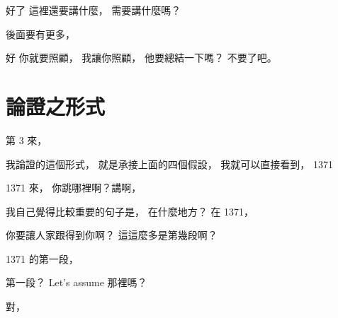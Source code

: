 \hypertarget{w06:cue:1870}{}好了 這裡還要講什麼，
\hypertarget{w06:cue:1871}{}需要講什麼嗎？

\hypertarget{w06:cue:1872}{}後面要有更多，

\hypertarget{w06:cue:1873}{}好 你就要照顧，
\hypertarget{w06:cue:1874}{}我讓你照顧，
\hypertarget{w06:cue:1875}{}他要總結一下嗎？
\hypertarget{w06:cue:1876}{}不要了吧。

\section{論證之形式}

\hypertarget{w06:cue:1877}{}第 3 來，

\hypertarget{w06:cue:1878}{}我論證的這個形式，
\hypertarget{w06:cue:1879}{}就是承接上面的四個假設，
\hypertarget{w06:cue:1880}{}我就可以直接看到，
\hypertarget{w06:cue:1881}{}1371

\hypertarget{w06:cue:1882}{}1371 來，
\hypertarget{w06:cue:1883}{}你跳哪裡啊？講啊，

\hypertarget{w06:cue:1884}{}我自己覺得比較重要的句子是，
\hypertarget{w06:cue:1885}{}在什麼地方？
\hypertarget{w06:cue:1886}{}在 1371，

\hypertarget{w06:cue:1887}{}你要讓人家跟得到你啊？
\hypertarget{w06:cue:1888}{}這這麼多是第幾段啊？

\hypertarget{w06:cue:1889}{}1371 的第一段，

\hypertarget{w06:cue:1890}{}第一段？
\hypertarget{w06:cue:1891}{}Let's assume 那裡嗎？

\hypertarget{w06:cue:1892}{}對，

